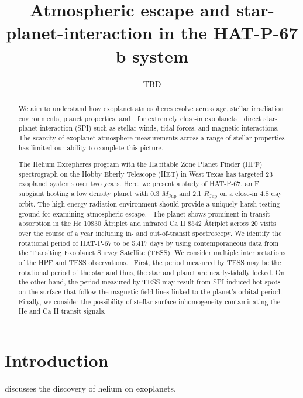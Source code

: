 \documentclass{aastex631}
\begin{document}

\title{Atmospheric escape and star-planet-interaction in the HAT-P-67 b system}

\author{TBD}


\begin{abstract}
    We aim to understand how exoplanet atmospheres evolve across age, stellar irradiation environments, planet properties, and---for extremely close-in exoplanets---direct star-planet interaction (SPI) such as stellar winds, tidal forces, and magnetic interactions. The scarcity of exoplanet atmosphere measurements across a range of stellar properties has limited our ability to complete this picture.

    The Helium Exospheres program with the Habitable Zone Planet Finder (HPF) spectrograph on the Hobby Eberly Telescope (HET) in West Texas has targeted 23 exoplanet systems over two years. Here, we present a study of HAT-P-67, an F subgiant hosting a low density planet with 0.3 $M_{\mathrm{Jup}}$ and 2.1 $R_{\mathrm{Jup}}$ on a close-in 4.8 day orbit. The high energy radiation environment should provide a uniquely harsh testing ground for examining atmospheric escape.  The planet shows prominent in-transit absorption in the He 10830 \AA triplet and infrared Ca II 8542 \AA triplet across 20 visits over the course of a year including in- and out-of-transit spectroscopy. We identify the rotational period of HAT-P-67 to be 5.417 days by using contemporaneous data from the Transiting Exoplanet Survey Satellite (TESS). We consider multiple interpretations of the HPF and TESS observations.  First, the period measured by TESS may be the rotational period of the star and thus, the star and planet are nearly-tidally locked. On the other hand, the period measured by TESS may result from SPI-induced hot spots on the surface that follow the magnetic field lines linked to the planet's orbital period. Finally, we consider the possibility of stellar surface inhomogeneity contaminating the He and Ca II transit signals.
\end{abstract}


\section{Introduction}\label{sec:intro}
\citet{2020ApJ...894...97N} discusses the discovery of helium on exoplanets.
\end{document}
